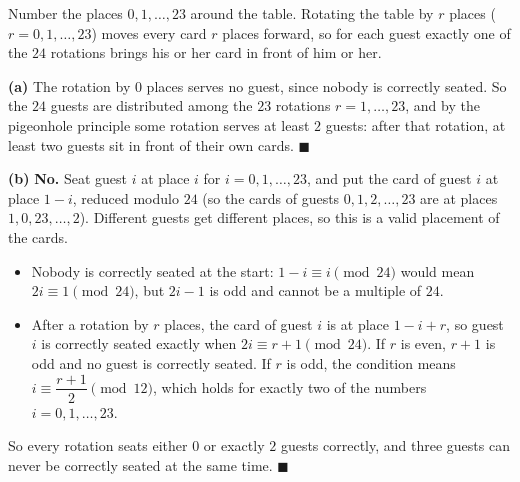 Number the places $0,1,\dots,23$ around the table. Rotating the table by $r$ places ($r=0,1,\dots,23$) moves every card $r$ places forward, so for each guest exactly one of the $24$ rotations brings his or her card in front of him or her.

\textbf{(a)} The rotation by $0$ places serves no guest, since nobody is correctly seated. So the $24$ guests are distributed among the $23$ rotations $r=1,\dots,23$, and by the pigeonhole principle some rotation serves at least $2$ guests: after that rotation, at least two guests sit in front of their own cards. $\blacksquare$

\textbf{(b)} \textbf{No.} Seat guest $i$ at place $i$ for $i=0,1,\dots,23$, and put the card of guest $i$ at place $1-i$, reduced modulo $24$ (so the cards of guests $0,1,2,\dots,23$ are at places $1,0,23,\dots,2$). Different guests get different places, so this is a valid placement of the cards.
\begin{itemize}
\item Nobody is correctly seated at the start: $1-i\equiv i\pmod{24}$ would mean $2i\equiv1\pmod{24}$, but $2i-1$ is odd and cannot be a multiple of $24$.
\item After a rotation by $r$ places, the card of guest $i$ is at place $1-i+r$, so guest $i$ is correctly seated exactly when $2i\equiv r+1\pmod{24}$. If $r$ is even, $r+1$ is odd and no guest is correctly seated. If $r$ is odd, the condition means $i\equiv\dfrac{r+1}{2}\pmod{12}$, which holds for exactly two of the numbers $i=0,1,\dots,23$.
\end{itemize}
So every rotation seats either $0$ or exactly $2$ guests correctly, and three guests can never be correctly seated at the same time. $\blacksquare$
